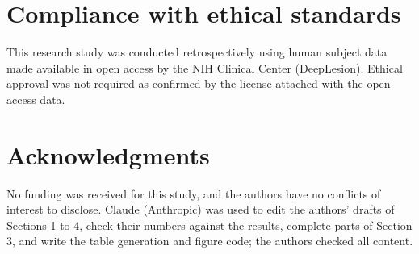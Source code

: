 \section{Compliance with ethical standards}
\label{sec:ethics}

This research study was conducted retrospectively using human subject data made available in open access by the NIH
Clinical Center (DeepLesion). Ethical approval was not required as confirmed by the license attached with the open
access data.

\section{Acknowledgments}
\label{sec:acknowledgments}

No funding was received for this study, and the authors have no conflicts of interest to disclose. Claude (Anthropic)
was used to edit the authors' drafts of Sections 1 to 4, check their numbers against the results, complete parts of
Section 3, and write the table generation and figure code; the authors checked all content.
